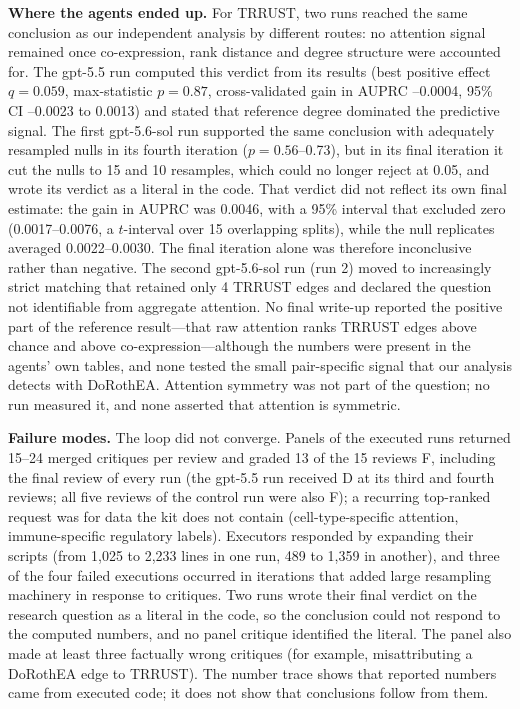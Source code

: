 \documentclass[10pt,letterpaper]{article}
\begin{document}
\textbf{Where the agents ended up.} For TRRUST, two runs reached the same conclusion as our independent analysis by different routes: no attention signal remained once co-expression, rank distance and degree structure were accounted for. The gpt-5.5 run computed this verdict from its results (best positive effect $q=0.059$, max-statistic $p=0.87$, cross-validated gain in AUPRC --0.0004, 95\% CI --0.0023 to 0.0013) and stated that reference degree dominated the predictive signal. The first gpt-5.6-sol run supported the same conclusion with adequately resampled nulls in its fourth iteration ($p=0.56$--0.73), but in its final iteration it cut the nulls to 15 and 10 resamples, which could no longer reject at 0.05, and wrote its verdict as a literal in the code. That verdict did not reflect its own final estimate: the gain in AUPRC was 0.0046, with a 95\% interval that excluded zero (0.0017--0.0076, a $t$-interval over 15 overlapping splits), while the null replicates averaged 0.0022--0.0030. The final iteration alone was therefore inconclusive rather than negative. The second gpt-5.6-sol run (run 2) moved to increasingly strict matching that retained only 4 TRRUST edges and declared the question not identifiable from aggregate attention. No final write-up reported the positive part of the reference result---that raw attention ranks TRRUST edges above chance and above co-expression---although the numbers were present in the agents' own tables, and none tested the small pair-specific signal that our analysis detects with DoRothEA. Attention symmetry was not part of the question; no run measured it, and none asserted that attention is symmetric.

\textbf{Failure modes.} The loop did not converge. Panels of the executed runs returned 15--24 merged critiques per review and graded 13 of the 15 reviews F, including the final review of every run (the gpt-5.5 run received D at its third and fourth reviews; all five reviews of the control run were also F); a recurring top-ranked request was for data the kit does not contain (cell-type-specific attention, immune-specific regulatory labels). Executors responded by expanding their scripts (from 1,025 to 2,233 lines in one run, 489 to 1,359 in another), and three of the four failed executions occurred in iterations that added large resampling machinery in response to critiques. Two runs wrote their final verdict on the research question as a literal in the code, so the conclusion could not respond to the computed numbers, and no panel critique identified the literal. The panel also made at least three factually wrong critiques (for example, misattributing a DoRothEA edge to TRRUST). The number trace shows that reported numbers came from executed code; it does not show that conclusions follow from them.
\end{document}
